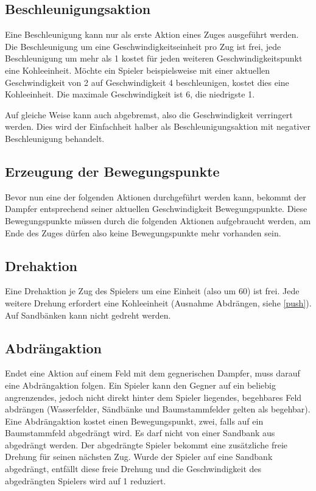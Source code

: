 \documentclass[12pt,a4paper, ngerman, oneside]{scrartcl}
\begin{document}
\subsection{\label{acceleration}Beschleunigungsaktion}

Eine Beschleunigung kann nur als erste Aktion eines Zuges ausgeführt werden. Die
Beschleunigung um eine Geschwindigkeitseinheit pro Zug ist frei, jede
Beschleunigung um mehr als 1 kostet für jeden weiteren Geschwindigkeitspunkt
eine Kohleeinheit. Möchte ein Spieler beispielsweise mit einer aktuellen
Geschwindigkeit von 2 auf Geschwindigkeit 4 beschleunigen, kostet dies eine
Kohleeinheit. Die maximale Geschwindigkeit ist 6, die niedrigste 1.

Auf gleiche Weise kann auch abgebremst, also die Geschwindigkeit verringert
werden. Dies wird der Einfachheit halber als Beschleunigungsaktion mit negativer
Beschleunigung behandelt.

\subsection{Erzeugung der Bewegungspunkte}

Bevor nun eine der folgenden Aktionen durchgeführt werden kann, bekommt der
Dampfer entsprechend seiner aktuellen Geschwindigkeit Bewegungspunkte. Diese
Bewegungspunkte müssen durch die folgenden Aktionen aufgebraucht werden, am Ende
des Zuges dürfen also keine Bewegungspunkte mehr vorhanden sein.

\subsection{\label{turn}Drehaktion}

Eine Drehaktion je Zug des Spielers um eine Einheit (also um 60\degree) ist
frei. Jede weitere Drehung erfordert eine Kohleeinheit (Ausnahme Abdrängen,
siehe \ref{push}). Auf Sandbänken kann nicht gedreht werden.


\subsection{\label{push}Abdrängaktion}

Endet eine Aktion auf einem Feld mit dem gegnerischen Dampfer, muss darauf eine
Abdrängaktion folgen. Ein Spieler kann den Gegner auf ein beliebig angrenzendes,
jedoch nicht direkt hinter dem Spieler liegendes, begehbares Feld abdrängen
(\label{passierbar}Wasserfelder, Sändbänke und Baumstammfelder gelten als
begehbar). Eine Abdrängaktion kostet einen Bewegungspunkt, zwei, falls auf ein
Baumstammfeld abgedrängt wird. Es darf nicht von einer Sandbank aus abgedrängt
werden. Der abgedrängte Spieler bekommt eine zusätzliche freie Drehung für
seinen nächsten Zug. Wurde der Spieler auf eine Sandbank abgedrängt, entfällt
diese freie Drehung und die Geschwindigkeit des abgedrängten Spielers wird auf 1
reduziert.
\end{document}
